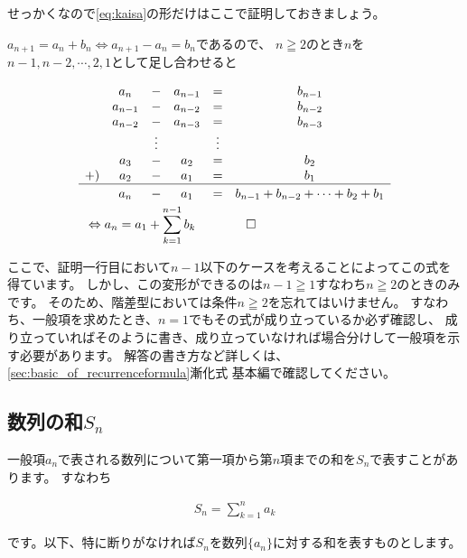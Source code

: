 \documentclass[a4paper]{ltjsarticle}
\begin{document}
せっかくなので\eqref{eq:kaisa}の形だけはここで証明しておきましょう。
\begin{prf*}
$a_{n+1} = a_n + b_n \Leftrightarrow a_{n+1} - a_n = b_n$であるので、
$n\geqq 2$のとき$n$を$n-1,n-2,\cdots,2,1$として足し合わせると
{\newcommand{\dl}[1]{\raisebox{-2pt}{$#1$}}
\begin{fleqn}[20pt]
  \begin{align*}
    &\begin{matrix}
      & a_n     & - & a_{n-1} & = & b_{n-1} \\
      & a_{n-1} & - & a_{n-2} & = & b_{n-2} \\
      & a_{n-2} & - & a_{n-3} & = & b_{n-3} \\
      &       & \vdots &    &\vdots &       \\
      & a_3     & - & a_2     & = & b_2     \\
  +) & a_2     & - & a_1     & = & b_1     \\
  \hline
      & \dl{a_n}     & \dl{-} & \dl{a_1}     & \dl{=} & \dl{b_{n-1} + b_{n-2} + \cdots + b_2 + b_1}
    \end{matrix}
    \\
    &\Leftrightarrow a_n = a_1 + \sum_{k=1}^{n-1}b_k \qquad \qed
  \end{align*}
\end{fleqn}
}
\end{prf*}

ここで、証明一行目において$n-1$以下のケースを考えることによってこの式を得ています。
しかし、この変形ができるのは$n-1\geqq 1$すなわち$n\geqq 2$のときのみです。
そのため、階差型においては条件$n\geqq 2$を忘れてはいけません。
すなわち、一般項を求めたとき、$n=1$でもその式が成り立っているか必ず確認し、
成り立っていればそのように書き、成り立っていなければ場合分けして一般項を示す必要があります。
解答の書き方など詳しくは、\ref*{sec:basic_of_recurrenceformula}漸化式 基本編で確認してください。


\subsection{数列の和$S_n$}
一般項$a_n$で表される数列について第一項から第$n$項までの和を$S_n$で表すことがあります。
すなわち
\begin{fleqn}[20pt]
  \begin{align*}
    S_n = \sum_{k=1}^{n}a_k
  \end{align*}
\end{fleqn}
です。以下、特に断りがなければ$S_n$を数列$\{a_n\}$に対する和を表すものとします。
\end{document}
